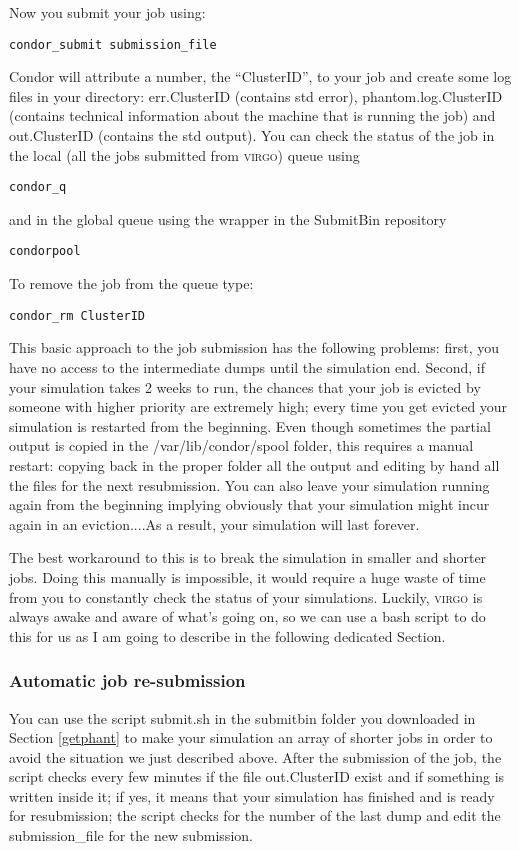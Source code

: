 \documentclass[10pt,a4paper,twoside]{article} %
\begin{document}
Now you submit your job using:
\begin{verbatim}
condor_submit submission_file
\end{verbatim}
Condor will attribute a number, the ``ClusterID'', to your job and create some log files in your directory: err.ClusterID (contains std error), phantom.log.ClusterID (contains technical information about the machine that is running the job) and out.ClusterID (contains the std output). You can check the status of the job in the local (all the jobs submitted from \textsc{virgo}) queue using
\begin{verbatim}
condor_q
\end{verbatim}
and in the global queue using the wrapper in the SubmitBin repository
\begin{verbatim}
condorpool
\end{verbatim}
To remove the job from the queue type:
\begin{verbatim}
condor_rm ClusterID
\end{verbatim}

This basic approach to the job submission has the following problems: first, you have no access to the intermediate dumps until the simulation end. Second, if your simulation takes 2 weeks to run, the chances that your job is evicted by someone with higher priority are extremely high; every time you get evicted your simulation is restarted from the beginning. Even though sometimes the partial output is copied in the /var/lib/condor/spool folder, this requires a manual restart: copying back in the proper folder all the output and editing by hand all the files for the next resubmission. You can also leave your simulation running again from the beginning implying obviously that your simulation might incur again in an eviction....As a result, your simulation will last forever.

The best workaround to this is to break the simulation in smaller and shorter jobs. Doing this manually is impossible, it would require a huge waste of time from you to constantly check the status of your simulations. Luckily, \textsc{virgo} is always awake and aware of what's going on, so we can use a bash script to do this for us as I am going to describe in the following dedicated Section.

\subsubsection{Automatic job re-submission}

You can use the script submit.sh in the submitbin folder you downloaded in Section \ref{getphant} to make your simulation an array of shorter jobs in order to avoid the situation we just described above.
After the submission of the job, the script checks every few minutes if the file out.ClusterID exist and if something is written inside it;
if yes, it means that your simulation has finished and is ready for resubmission; the script checks for the number of the last dump and edit the submission\_file for the new submission. 
\end{document}
